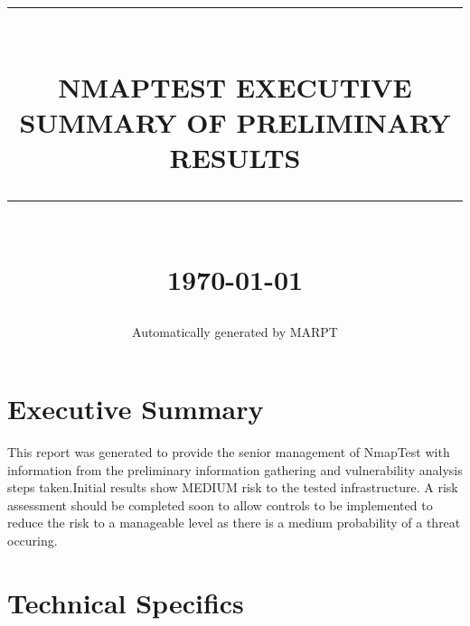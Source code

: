 \documentclass[12pt]{report}
\newcommand{\HRule}[1]{\rule{\linewidth}{#1}}
\begin{document}
\title{ \normalsize \textsc{}
		\\ [2.0cm]
		\HRule{0.5pt} \\
		\LARGE \textbf{\uppercase{NmapTest
		 EXECUTIVE SUMMARY OF PRELIMINARY RESULTS}}
		\HRule{2pt} \\ [0.5cm]
		\normalsize \today \vspace*{5\baselineskip}}
\date{}
\author{Automatically generated by MARPT}
\maketitle
\tableofcontents
\newpage
\sectionfont{\scshape}\section{Executive Summary}
This report was generated to provide the senior management of NmapTest with information from the preliminary information gathering and vulnerability analysis steps taken.Initial results show MEDIUM risk to the tested infrastructure. A risk assessment should be completed soon to allow controls to be implemented to reduce the risk to a manageable level as there is a medium probability of a threat occuring. \newpage\section{Technical Specifics}
\end{document}
